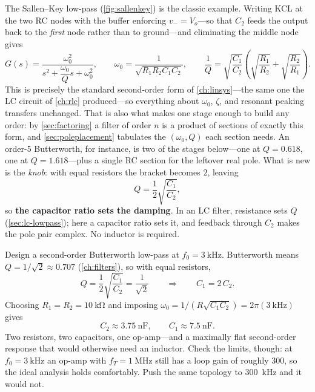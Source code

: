 The Sallen--Key low-pass (\cref{fig:sallenkey}) is the classic example. Writing KCL at
the two RC nodes with the buffer enforcing \(v_-=V_o\)---so that \(C_2\) feeds the
output back to the \emph{first} node rather than to ground---and eliminating the middle
node gives
\[
G(s)=\frac{\omega_0^2}{s^2+\dfrac{\omega_0}{Q}s+\omega_0^2},
\qquad
\omega_0=\frac{1}{\sqrt{R_1R_2C_1C_2}},
\qquad
\frac{1}{Q}=\sqrt{\frac{C_1}{C_2}}
\left(\sqrt{\frac{R_1}{R_2}}+\sqrt{\frac{R_2}{R_1}}\right).
\]
This is precisely the standard second-order form of \cref{ch:linsys}---the same one the
LC circuit of \cref{ch:rlc} produced---so everything about \(\omega_0\), \(\zeta\), and
resonant peaking transfers unchanged. That is also what makes one stage enough to
build any order: by \cref{sec:factoring} a filter of order \(n\) is a product of
sections of exactly this form, and \cref{sec:poleplacement} tabulates the
\((\omega_0,Q)\) each section needs. An order-5 Butterworth, for instance, is two of
the stages below---one at \(Q=0.618\), one at \(Q=1.618\)---plus a single RC section
for the leftover real pole. What is new is the \emph{knob}: with equal
resistors the bracket becomes \(2\), leaving
\[
Q=\frac{1}{2}\sqrt{\frac{C_1}{C_2}} ,
\]
so \textbf{the capacitor ratio sets the damping}. In an LC filter, resistance sets
\(Q\) (\cref{sec:lc-lowpass}); here a capacitor ratio sets it, and feedback through
\(C_2\) makes the pole pair complex. No inductor is required.

\begin{workedbox}
Design a second-order Butterworth low-pass at \(f_0=\SI{3}{\kilo\hertz}\).
Butterworth means \(Q=1/\sqrt2\approx0.707\) (\cref{ch:filters}), so with equal
resistors,
\[
Q=\frac{1}{2}\sqrt{\frac{C_1}{C_2}}=\frac{1}{\sqrt2}
\qquad\Longrightarrow\qquad
C_1=2\,C_2 .
\]
Choosing \(R_1=R_2=\SI{10}{\kilo\ohm}\) and imposing
\(\omega_0=1/(R\sqrt{C_1C_2})=2\pi(\SI{3}{\kilo\hertz})\) gives
\[
C_2\approx\SI{3.75}{\nano\farad},
\qquad
C_1\approx\SI{7.5}{\nano\farad}.
\]
Two resistors, two capacitors, one op-amp---and a maximally flat second-order response
that would otherwise need an inductor. Check the limits, though: at
\(f_0=\SI{3}{\kilo\hertz}\) an op-amp with \(f_T=\SI{1}{\mega\hertz}\) still has a loop
gain of roughly \(300\), so the ideal analysis holds comfortably. Push the same
topology to \SI{300}{\kilo\hertz} and it would not.
\end{workedbox}


